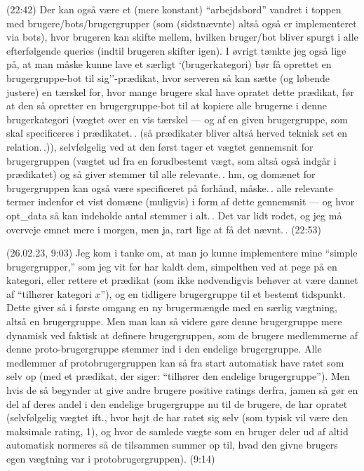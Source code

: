 \documentclass{report}
\begin{document}
(22:42) Der kan også være et (mere konstant) ``arbejdsbord'' vandret i toppen med brugere/bots/brugergrupper (som (sidstnævnte) altså også er implementeret via bots), hvor brugeren kan skifte mellem, hvilken bruger/bot bliver spurgt i alle efterfølgende queries (indtil brugeren skifter igen). I øvrigt tænkte jeg også lige på, at man måske kunne lave et særligt `(brugerkategori) bør få oprettet en brugergruppe-bot til sig''-prædikat, hvor serveren så kan sætte (og løbende justere) en tærskel for, hvor mange brugere skal have opratet dette prædikat, før at den så opretter en brugergruppe-bot til at kopiere alle brugerne i denne brugerkategori (vægtet over en vis tærskel --- og af en given brugergruppe, som skal specificeres i prædikatet.\,. (så prædikater bliver altså herved teknisk set en relation.\,.)), selvfølgelig ved at den først tager et vægtet gennemsnit for brugergruppen (vægtet ud fra en forudbestemt vægt, som altså også indgår i prædikatet) og så giver stemmer til alle relevante.\,. hm, og domænet for brugergruppen kan også være specificeret på forhånd, måske.\,. alle relevante termer indenfor et vist domæne (muligvis) i form af dette gennemsnit --- og hvor opt\_data så kan indeholde antal stemmer i alt.\,. Det var lidt rodet, og jeg må overveje emnet mere i morgen, men ja, rart lige at få det nævnt.\,. (22:53)

(26.02.23, 9:03) Jeg kom i tanke om, at man jo kunne implementere mine ``simple brugergrupper,'' som jeg vit før har kaldt dem, simpelthen ved at pege på en kategori, eller rettere et prædikat (som ikke nødvendigvis behøver at være dannet af ``tilhører kategori $x$''), og en tidligere brugergruppe til et bestemt tidspunkt. Dette giver så i første omgang en ny brugermængde med en særlig vægtning, altså en brugergruppe. Men man kan så videre gøre denne brugergruppe mere dynamisk ved faktisk at definere brugergruppen, som de brugere medlemmerne af denne proto-brugergruppe stemmer ind i den endelige brugergruppe. Alle medlemmer af protobrugergruppen kan så fra start automatisk have ratet som selv op (med et prædikat, der siger: ``tilhører den endelige brugergruppe''). Men hvis de så begynder at give andre brugere positive ratings derfra, jamen så gør en del af deres andel i den endelige brugergruppe nu til de brugere, de har opratet (selvfølgelig vægtet ift., hvor højt de har ratet sig selv (som typisk vil være den maksimale rating, 1), og hvor de samlede vægte som en bruger deler ud af altid automatisk normeres så de tilsammen summer op til, hvad den givne brugers egen vægtning var i protobrugergruppen). (9:14)
\end{document}
